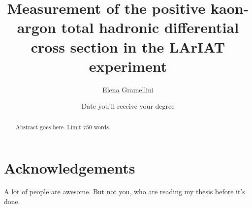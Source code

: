 \documentclass[letterpaper,12pt]{yalephd}
\newenvironment{dedication}
  {%
   \thispagestyle{empty}%
   \vspace*{\stretch{1}}%
   \itshape             %
   \raggedleft          %
  }
  {\par %
   \vspace{\stretch{3}} %
   \clearpage           %
  }
\begin{document}
\title{Measurement of the positive kaon-argon total hadronic differential cross section in the LArIAT experiment}
\author{Elena Gramellini}
\date{Date you'll receive your degree} %

\frontmatter

\begin{abstract}
Abstract goes here. Limit 750 words.
\end{abstract}


\maketitle
{}

\tableofcontents
\listoffigures %
\listoftables %

\chapter{Acknowledgements} %
A lot of people are awesome. But not you, who are reading my thesis before it's done.
\end{document}
